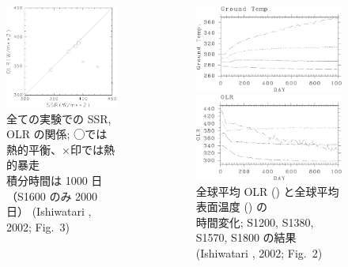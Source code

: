 \documentclass[aspectratio=149,9pt,fleqn]{beamer}
\begin{document}
\begin{frame}
\begin{columns}[T,onlytextwidth]
\begin{column}{.6\textwidth}
\begin{itemize}
					\begin{figure}
						\scriptsize
						\includegraphics[width=.4\textwidth]{./fig/ISR-OLR.kps-crop.pdf}\\
						全ての実験での SSR, OLR の関係; ◯では熱的平衡、×印では熱的暴走\\
						積分時間は 1000 日（S1600 のみ 2000 日） (Ishiwatari \etal*, 2002; Fig.~3)
					\end{figure}
			\end{itemize}
		\end{column}
		\begin{column}{.4\textwidth}
			\scriptsize
			\begin{figure}
				\includegraphics[width=.9\textwidth]{./fig/Tg-seqs.kps-crop.pdf}\\
				\includegraphics[width=.9\textwidth]{./fig/OLR-seqs.kps-crop.pdf}\\
				全球平均 OLR () と全球平均表面温度 () の\\
				時間変化; S1200, S1380, S1570, S1800 の結果\\
				(Ishiwatari \etal*, 2002; Fig.~2)
			\end{figure}
		\end{column}
	\end{columns}
\end{frame}
\end{document}
